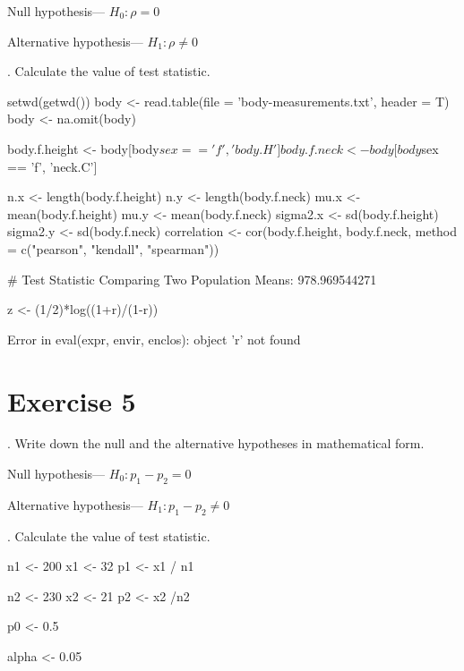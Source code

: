 \documentclass[12pt, oneside]{report}\usepackage[]{graphicx}\usepackage[]{color}
\begin{document}
Null hypothesis— $H_0 : \rho = 0$ \newline

Alternative hypothesis— $H_1 : \rho \neq 0$ \newline

. Calculate the value of test statistic. \newline
\begin{Schunk}
\begin{Sinput}
setwd(getwd())
body <- read.table(file = 'body-measurements.txt', header = T)
body <- na.omit(body)

body.f.height <- body[body$sex == 'f', 'body.H']
body.f.neck <- body[body$sex == 'f', 'neck.C']

n.x <- length(body.f.height)
n.y <- length(body.f.neck)
mu.x <- mean(body.f.height)
mu.y <- mean(body.f.neck)
sigma2.x <- sd(body.f.height)
sigma2.y <- sd(body.f.neck)
  correlation <- cor(body.f.height, body.f.neck, method = c("pearson", "kendall", "spearman"))

# Test Statistic Comparing Two Population Means: 978.969544271

z <- (1/2)*log((1+r)/(1-r))
\end{Sinput}
\begin{Soutput}
Error in eval(expr, envir, enclos): object 'r' not found
\end{Soutput}
\end{Schunk}

\section*{Exercise 5}
. Write down the null and the alternative hypotheses in mathematical form. \newline

Null hypothesis— $H_0: p_1 - p_2 = 0$ \newline

Alternative hypothesis— $H_1: p_1 - p_2 \neq 0$ \newline

. Calculate the value of test statistic. \newline
\begin{Schunk}
\begin{Sinput}
n1 <- 200
x1 <- 32
p1 <- x1 / n1

n2 <- 230
x2 <- 21
p2 <- x2 /n2

p0 <- 0.5

alpha <- 0.05
\end{Sinput}
\end{Schunk}
\end{document}
